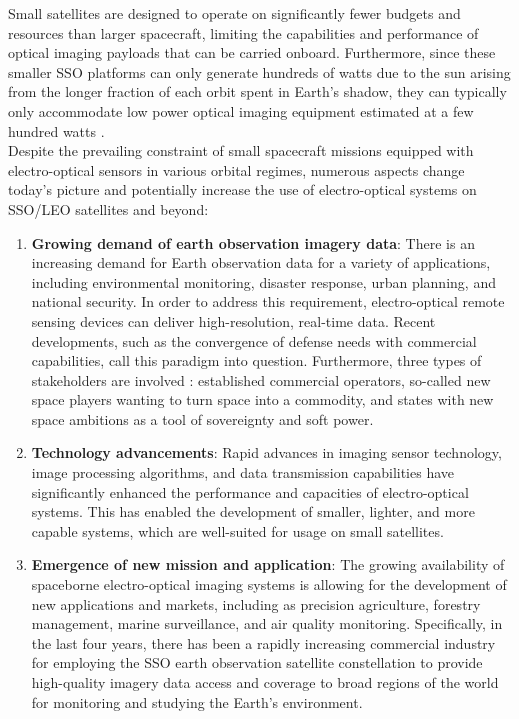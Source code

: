 \documentclass[final,5p,times,twocolumn,authoryear]{elsarticle}
\begin{document}
Small satellites are designed to operate on significantly fewer budgets and resources than larger spacecraft, limiting the capabilities and performance of optical imaging payloads that can be carried onboard. Furthermore, since these smaller SSO platforms can only generate hundreds of watts due to the sun arising from the longer fraction of each orbit spent in Earth's shadow, they can typically only accommodate low power optical imaging equipment estimated at a few hundred watts \citep{selva2012survey}. \\
Despite the prevailing constraint of small spacecraft missions equipped with electro-optical sensors in various orbital regimes, numerous aspects change today's picture and potentially increase the use of electro-optical systems on SSO/LEO satellites and beyond:
\begin{enumerate}
	\item \textbf{Growing demand of earth observation imagery data}: There is an increasing demand for Earth observation data for a variety of applications, including environmental monitoring, disaster response, urban planning, and national security. In order to address this requirement, electro-optical remote sensing devices can deliver high-resolution, real-time data. Recent developments, such as the convergence of defense needs with commercial capabilities, call this paradigm into question. Furthermore, three types of stakeholders are involved  \citep{denis2017towards}: established commercial operators, so-called new space players wanting to turn space into a commodity, and states with new space ambitions as a tool of sovereignty and soft power.
	\item \textbf{Technology advancements}: Rapid advances in imaging sensor technology, image processing algorithms, and data transmission capabilities have significantly enhanced the performance and capacities of electro-optical systems. This has enabled the development of smaller, lighter, and more capable systems, which are well-suited for usage on small satellites.
	\item \textbf{Emergence of new mission and application}: The growing availability of spaceborne electro-optical imaging systems is allowing for the development of new applications and markets, including as precision agriculture, forestry management, marine surveillance, and air quality monitoring. Specifically, in the last four years, there has been a rapidly increasing commercial industry for employing the SSO earth observation satellite constellation \citep{sandau2010status} to provide high-quality imagery data access and coverage to broad regions of the world for monitoring and studying the Earth's environment.

\end{enumerate}
\end{document}

